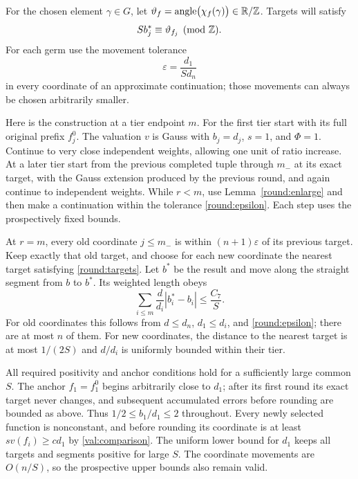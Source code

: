 For the chosen element $\gamma\in G$, let
$\vartheta_f=\operatorname{angle}\bigl(\chi_f(\gamma)\bigr)\in\mathbb R/\mathbb Z$. Targets will satisfy
\begin{equation}\label{round:targets}
 S b_j^*\equiv\vartheta_{f_j}\pmod{\mathbb Z}.
\end{equation}
For each germ use the movement tolerance
\begin{equation}\label{round:epsilon}
 \varepsilon=\frac{d_1}{Sd_n}
\end{equation}
in every coordinate of an approximate continuation; those
movements can always be chosen arbitrarily smaller.

Here is the construction at a tier endpoint $m$.
For the first tier start with its full original prefix $f_j^0$.
The valuation $v$ is Gauss with $b_j=d_j$, $s=1$, and
$\Phi=1$. Continue to very close independent weights, allowing
one unit of ratio increase. At a later tier start from the
previous completed tuple through $m_-$ at its exact target,
with the Gauss extension produced by the previous round, and
again continue to independent weights. While $r<m$, use
Lemma~\ref{round:enlarge} and then make a continuation within
the tolerance \eqref{round:epsilon}. Each step uses the
prospectively fixed bounds.

At $r=m$, every old coordinate $j\le m_-$ is within
$(n+1)\varepsilon$ of its previous target. Keep exactly that
old target, and choose for each new coordinate the nearest
target satisfying \eqref{round:targets}. Let $b^*$ be the
result and move along the straight segment from $b$ to $b^*$.
Its weighted length obeys
\begin{equation}\label{round:movement}
 \sum_{i\le m}\frac d{d_i}|b_i^*-b_i|\le\frac{C_7}{S}.
\end{equation}
For old coordinates this follows from
$d\le d_n$, $d_1\le d_i$, and \eqref{round:epsilon}; there
are at most $n$ of them. For new coordinates, the distance
to the nearest target is at most $1/(2S)$ and $d/d_i$ is
uniformly bounded within their tier.

All required positivity and anchor conditions hold for a
sufficiently large common $S$. The anchor $f_1=f_1^0$ begins
arbitrarily close to $d_1$; after its first round its exact
target never changes, and subsequent accumulated errors before
rounding are bounded as above. Thus
$1/2\le b_1/d_1\le2$ throughout. Every newly selected function
is nonconstant, and before rounding its coordinate is at least
$s v(f_i)\ge c d_1$ by \eqref{val:comparison}. The uniform lower
bound for $d_1$ keeps all targets and segments positive for
large $S$. The coordinate movements are $O(n/S)$, so the
prospective upper bounds also remain valid.

